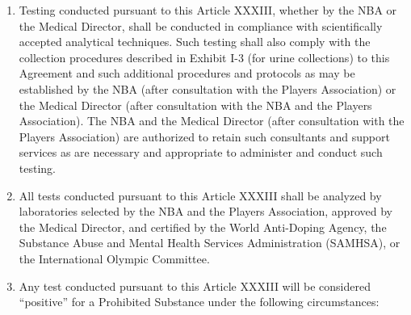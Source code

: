 \documentclass[
]{book}
\providecommand{\tightlist}{%
  \setlength{\itemsep}{0pt}\setlength{\parskip}{0pt}}
\begin{document}
\begin{enumerate}
\def\labelenumi{(\alph{enumi})}
\tightlist
\item
  Testing conducted pursuant to this Article XXXIII, whether by the NBA or the Medical Director, shall be conducted in compliance with scientifically accepted analytical techniques. Such testing shall also comply with the collection procedures described in Exhibit I-3 (for urine collections) to this Agreement and such additional procedures and protocols as may be established by the NBA (after consultation with the Players Association) or the Medical Director (after consultation with the NBA and the Players Association). The NBA and the Medical Director (after consultation with the Players Association) are authorized to retain such consultants and support services as are necessary and appropriate to administer and conduct such testing.
\item
  All tests conducted pursuant to this Article XXXIII shall be analyzed by laboratories selected by the NBA and the Players Association, approved by the Medical Director, and certified by the World Anti-Doping Agency, the Substance Abuse and Mental Health Services Administration (SAMHSA), or the International Olympic Committee.
\item
  Any test conducted pursuant to this Article XXXIII will be considered ``positive'' for a Prohibited Substance under the following circumstances:


\end{enumerate}
\end{document}
